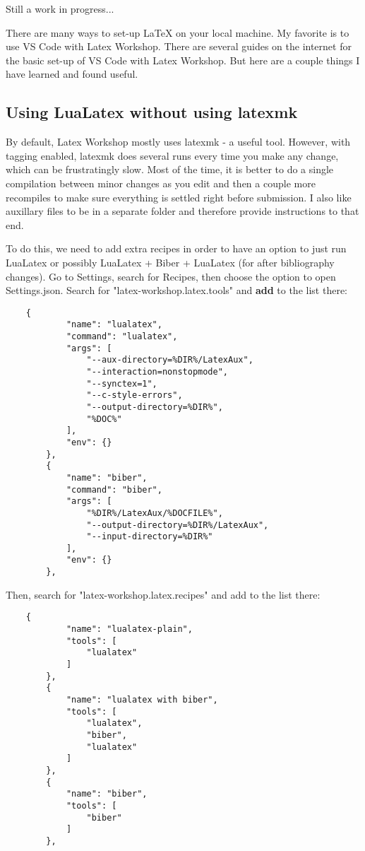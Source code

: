 \documentclass{article}
\begin{document}
Still a work in progress...

There are many ways to set-up LaTeX on your local machine.
My favorite is to use VS Code with Latex Workshop.
There are several guides on the internet for the basic set-up of VS Code with Latex Workshop.
But here are a couple things I have learned and found useful.

\subsection{Using LuaLatex without using latexmk}
By default, Latex Workshop mostly uses latexmk - a useful tool. However, with tagging enabled, latexmk does several runs every time you make any change, which can be frustratingly slow.
Most of the time, it is better to do a single compilation between minor changes as you edit and then a couple more recompiles to make sure everything is settled right before submission.
I also like auxillary files to be in a separate folder and therefore provide instructions to that end.

To do this, we need to add extra recipes in order to have an option to just run LuaLatex or possibly LuaLatex + Biber + LuaLatex (for after bibliography changes).
Go to Settings, search for Recipes, then choose the option to open Settings.json.
Search for "latex-workshop.latex.tools" and \textbf{add} to the list there:
\begin{verbatim}
    {
            "name": "lualatex",
            "command": "lualatex",
            "args": [
                "--aux-directory=%DIR%/LatexAux",
                "--interaction=nonstopmode",
                "--synctex=1",
                "--c-style-errors",
                "--output-directory=%DIR%",
                "%DOC%"
            ],
            "env": {}
        },
        {
            "name": "biber",
            "command": "biber",
            "args": [
                "%DIR%/LatexAux/%DOCFILE%",
                "--output-directory=%DIR%/LatexAux",
                "--input-directory=%DIR%"
            ],
            "env": {}
        },
\end{verbatim}

Then, search for "latex-workshop.latex.recipes" and add to the list there:
\begin{samepage}
    \begin{verbatim}
    {
            "name": "lualatex-plain",
            "tools": [
                "lualatex"
            ]
        },
        {
            "name": "lualatex with biber",
            "tools": [
                "lualatex",
                "biber",
                "lualatex"
            ]
        },
        {
            "name": "biber",
            "tools": [
                "biber"
            ]
        },
\end{verbatim}
\end{samepage}
\end{document}
